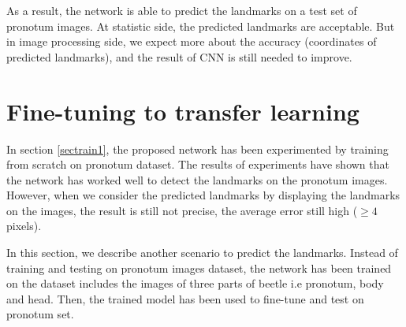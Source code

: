 \documentclass[10pt]{article}
\begin{document}


As a result, the network is able to predict the landmarks on a test set of pronotum images. At statistic side, the predicted landmarks are acceptable. But in image processing side, we expect more about the accuracy (coordinates of predicted landmarks), and the result of CNN is still needed to improve. 
\section{Fine-tuning to transfer learning}
\label{secimproving}
In section \ref{sectrain1}, the proposed network has been experimented by training from scratch on pronotum dataset. The results of experiments have shown that the network has worked well to detect the landmarks on the pronotum images. However, when we consider the predicted landmarks by displaying the landmarks on the images, the result is still not precise, the average error still high ($\geq 4$ pixels). 

In this section, we describe another scenario to predict the landmarks. Instead of training and testing on pronotum images dataset, the network has been trained on the dataset includes the images of three parts of beetle i.e pronotum, body and head. Then, the trained model has been used to fine-tune and test on pronotum set.

\end{document}
